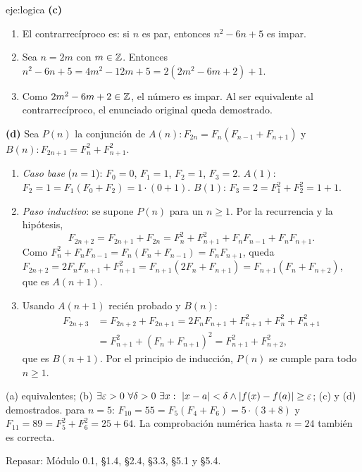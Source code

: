 \begin{solucion}{eje:logica}
\noindent\textbf{(c)}
\begin{enumerate}[label=\arabic*.]
  \item El contrarrecíproco es: si $n$ es par, entonces $n^{2}-6n+5$ es impar.
  \item Sea $n=2m$ con $m\in\mathbb{Z}$. Entonces $n^{2}-6n+5=4m^{2}-12m+5=2(2m^{2}-6m+2)+1$.
  \item Como $2m^{2}-6m+2\in\mathbb{Z}$, el número es impar. Al ser equivalente al contrarrecíproco, el enunciado original queda demostrado.
\end{enumerate}

\noindent\textbf{(d)} Sea $P(n)$ la conjunción de $A(n)\colon F_{2n}=F_n(F_{n-1}+F_{n+1})$ y $B(n)\colon F_{2n+1}=F_n^{2}+F_{n+1}^{2}$.
\begin{enumerate}[label=\arabic*.]
  \item \emph{Caso base} ($n=1$): $F_0=0$, $F_1=1$, $F_2=1$, $F_3=2$. $A(1)$: $F_2=1=F_1(F_0+F_2)=1\cdot(0+1)$. $B(1)$: $F_3=2=F_1^{2}+F_2^{2}=1+1$.
  \item \emph{Paso inductivo}: se supone $P(n)$ para un $n\ge1$. Por la recurrencia y la hipótesis,
  \[
  F_{2n+2}=F_{2n+1}+F_{2n}=F_n^{2}+F_{n+1}^{2}+F_nF_{n-1}+F_nF_{n+1}.
  \]
  Como $F_n^{2}+F_nF_{n-1}=F_n(F_n+F_{n-1})=F_nF_{n+1}$, queda $F_{2n+2}=2F_nF_{n+1}+F_{n+1}^{2}=F_{n+1}(2F_n+F_{n+1})=F_{n+1}(F_n+F_{n+2})$, que es $A(n+1)$.
  \item Usando $A(n+1)$ recién probado y $B(n)$:
  \[
  \begin{aligned}
  F_{2n+3}&=F_{2n+2}+F_{2n+1}=2F_nF_{n+1}+F_{n+1}^{2}+F_n^{2}+F_{n+1}^{2}\\
  &=F_{n+1}^{2}+(F_n+F_{n+1})^{2}=F_{n+1}^{2}+F_{n+2}^{2},
  \end{aligned}
  \]
  que es $B(n+1)$. Por el principio de inducción, $P(n)$ se cumple para todo $n\ge1$.
\end{enumerate}
\resultado (a) equivalentes; (b) $\exists\varepsilon>0\ \forall\delta>0\ \exists x:\ \abs{x-a}<\delta\wedge\abs{f(x)-f(a)}\ge\varepsilon$; (c) y (d) demostrados.
\comprobacion para $n=5$: $F_{10}=55=F_5(F_4+F_6)=5\cdot(3+8)$ y $F_{11}=89=F_5^{2}+F_6^{2}=25+64$. La comprobación numérica hasta $n=24$ también es correcta.


\noindent Repasar: Módulo 0.1, §1.4, §2.4, §3.3, §5.1 y §5.4.
\end{solucion}

